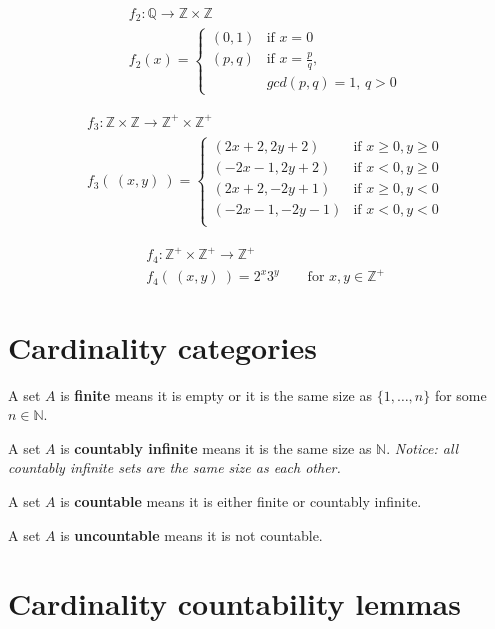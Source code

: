 \documentclass[12pt, oneside]{article}
\begin{document}
\begin{align*}
    &f_2: \mathbb{Q} \to \mathbb{Z} \times \mathbb{Z} \\
    &f_2(x) = \begin{cases}
        (0,1) & \text{if $x = 0$} \\
        (p,q) & \text{if $x = \frac{p}{q}$,}\\
                & \text{$gcd(p,q) = 1$, $q > 0$}
    \end{cases}
\end{align*}
\begin{multicols}{2}
\begin{align*}
    &f_3: \mathbb{Z} \times \mathbb{Z} \to \mathbb{Z}^+ \times \mathbb{Z}^+ \\
    &f_3(~(x,y)~) = \begin{cases}
        (2x+2, 2y+2) & \text{if $x \geq 0, y \geq 0$} \\
        (-2x-1, 2y+2) & \text{if $x < 0, y \geq 0$} \\
        (2x+2, -2y+1) & \text{if $x \geq 0, y < 0$} \\
        (-2x-1, -2y-1) & \text{if $x < 0, y < 0$} \\
    \end{cases}
\end{align*}

\begin{align*}
    &f_4: \mathbb{Z}^+ \times \mathbb{Z}^+ \to \mathbb{Z}^+ \\
    &f_4(~(x,y)~) = 2^x 3^y \qquad \text{for $x,y \in \mathbb{Z}^+$}
\end{align*}
\end{multicols} \vfill
\section*{Cardinality categories}


A set $A$ is {\bf finite} means it is empty or it is the same size as $\{ 1, \ldots, n \}$ for some $n \in \mathbb{N}$.

A set $A$ is {\bf countably infinite} means it is the same size as $\mathbb{N}$. {\it Notice: 
all countably infinite sets are the same size as each other.}

A set $A$ is {\bf countable} means it is either finite or countably infinite.

A set $A$ is {\bf uncountable} means it is not countable. \vfill
\section*{Cardinality countability lemmas}
\end{document}
